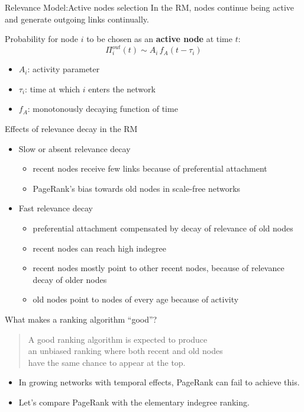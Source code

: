 \begin{frame}{Relevance Model:\@ Active nodes selection}
    In the RM, nodes \alert{continue being active} and generate outgoing links continually.

    Probability for node $i$ to be chosen as an \textbf{active node} at time $t$:
    \[
        \Pi_i^{out}(t) \sim A_i \, f_A (t-\tau_i)
    \]
    \begin{itemize}
        \item $A_i$: activity parameter
        \item $\tau_i$: time at which $i$ enters the network
        \item $f_A$: monotonously decaying function of time
    \end{itemize}
\end{frame}

\begin{frame}{Effects of relevance decay in the RM}
\begin{itemize}
    \item \alert{Slow} or absent relevance decay
    \begin{itemize}
        \item recent nodes receive few links because of preferential attachment
        \item PageRank's bias towards old nodes in scale-free networks
    \end{itemize}
    \item \alert{Fast} relevance decay
    \begin{itemize}
        \item preferential attachment compensated by decay of relevance of old nodes
        \item recent nodes can reach high indegree
        \item recent nodes mostly point to other recent nodes, because of relevance decay of older nodes
        \item old nodes point to nodes of every age because of activity
    \end{itemize}
\end{itemize}
\end{frame}

\begin{frame}{What makes a ranking algorithm ``good''?}
    \begin{quote}
        A good ranking algorithm is expected to produce \\ an unbiased ranking where both \alert{recent} and \alert{old} nodes \\ have \alert{the same chance to appear at the top}.
    \end{quote}
    \begin{itemize}
        \item In growing networks with temporal effects, \alert{PageRank can fail} to achieve this.
        \item Let's compare PageRank with the elementary \alert{indegree ranking}.
    \end{itemize}
\end{frame}

